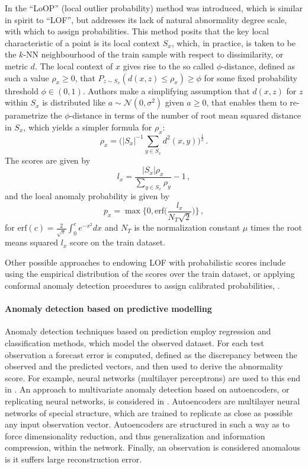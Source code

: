 \documentclass[a4paper,14pt]{extarticle}
\newcommand{\Ncal}{\mathcal{N}}
\begin{document}
In \cite{kriegel2009} the ``LoOP'' (local outlier probability) method was introduced,
which is similar in spirit to ``LOF'', but addresses its lack of natural abnormality
degree scale, with which to assign probabilities. This method posits that the key
local characteristic of a point is its local context $S_x$, which, in practice, is
taken to be the $k$-NN neighbourhood of the train sample with respect to dissimilarity,
or metric $d$. The local context of $x$ gives rise to the so called $\phi$-distance,
defined as such a value $\rho_x\geq 0$, that $P_{z\sim S_x}(d(x,z)\leq \rho_x)\geq \phi$
for some fixed probability threshold $\phi\in(0,1)$. Authors make a simplifying assumption
that $d(x,z)$ for $z$ within $S_x$ is distributed like $a\sim \Ncal(0, \sigma^2)$
given $a\geq0$, that enables them to re-parametrize the $\phi$-distance in terms of
the number of root mean squared distance in $S_x$, which yields a simpler formula
for $\rho_x$:
\begin{equation*}
    \rho_x
    = \bigl(|S_x|^{-1} \sum_{y \in S_x} d^2(x, y)\bigr)^\frac{1}{2}
    \,.
\end{equation*}
The scores are given by 
$$ l_x = \frac{|S_x|\rho_x}{\sum_{y\in S_x} \rho_y}-1\,, $$
and the local anomaly probability is given by
$$ p_x = \max\bigl\{0, \text{erf}\bigl(\frac{l_x}{N_T\sqrt{2}}\bigr)\Bigr\}\,, $$
for $\text{erf}(c) = \frac{2}{\sqrt{\pi}} \int_0^c e^{-x^2} dx$ and $N_T$ is the
normalization constant $\mu$ times the root means squared $l_x$ score on the train
dataset.

Other possible approaches to endowing LOF with probabilistic scores include using
the empirical distribution of the scores over the train dataset, or applying conformal
anomaly detection procedures to assign calibrated probabilities, \cite{laxhammar2014}.


\paragraph{Anomaly detection based on predictive modelling} %
\label{par:anomaly_detection_based_on_predictive_modelling}

Anomaly detection techniques based on prediction employ regression and classification
methods, which model the observed dataset. For each test observation a forecast error
is computed, defined as the discrepancy between the observed and the predicted vectors,
and then used to derive the abnormality score. For example, neural networks (multilayer
perceptrons) are used to this end in \cite{augusteijn2002}. An approach to multivariate
anomaly detection based on autoencoders, or replicating neural networks, is considered
in \cite{hawkins2002,williams2002}. Autoencoders are multilayer neural networks of
special structure, which are trained to replicate as close as possible any input
observation vector. Autoencoders are structured in such a way as to force dimensionality
reduction, and thus generalization and information compression, within the network.
Finally, an observation is considered anomalous is it suffers large reconstruction
error.
\end{document}
